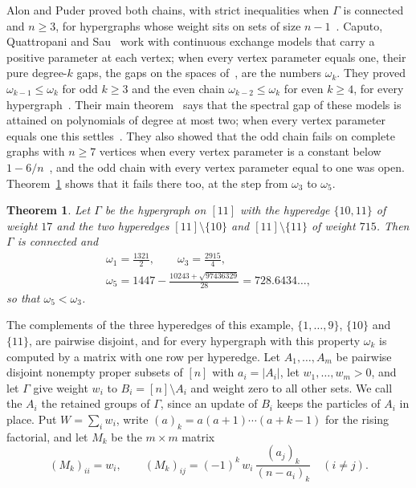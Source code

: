 \documentclass[11pt]{amsart}
\newtheorem{thm}{Theorem}[section]
\theoremstyle{remark}
\numberwithin{equation}{section}
\begin{document}
Alon and Puder proved both chains, with strict inequalities when $\Gamma$ is connected and $n\ge3$, for hypergraphs whose weight sits on sets of size $n-1$~\cite[Corollary~4.15]{AP26}. Caputo, Quattropani and Sau~\cite{CQS26} work with continuous exchange models that carry a positive parameter at each vertex; when every vertex parameter equals one, their pure degree-$k$ gaps, the gaps on the spaces of~\cite[(1.21)]{CQS26}, are the numbers $\omega_k$. They proved $\omega_{k-1}\le\omega_k$ for odd $k\ge3$ and the even chain $\omega_{k-2}\le\omega_k$ for even $k\ge4$, for every hypergraph~\cite[Remark~2.10, (2.50)--(2.51)]{CQS26}. Their main theorem~\cite[Theorem~1.1]{CQS26} says that the spectral gap of these models is attained on polynomials of degree at most two; when every vertex parameter equals one this settles~\cite[Conjecture~1.15]{AP26}. They also showed that the odd chain fails on complete graphs with $n\ge7$ vertices when every vertex parameter is a constant below $1-6/n$~\cite[Remark~2.10]{CQS26}, and the odd chain with every vertex parameter equal to one was open. Theorem~\ref{thm:example} shows that it fails there too, at the step from $\omega_3$ to $\omega_5$.

\begin{thm}\label{thm:example}
Let $\Gamma$ be the hypergraph on $[11]$ with the hyperedge $\{10,11\}$ of weight $17$ and the two hyperedges $[11]\setminus\{10\}$ and $[11]\setminus\{11\}$ of weight $715$. Then $\Gamma$ is connected and
\begin{gather*}
\omega_1=\frac{1321}2,\qquad \omega_3=\frac{2915}4,\\
\omega_5=1447-\frac{10243+\sqrt{97436329}}{28}=728.6434\ldots,
\end{gather*}
so that $\omega_5<\omega_3$.
\end{thm}

The complements of the three hyperedges of this example, $\{1,\dots,9\}$, $\{10\}$ and $\{11\}$, are pairwise disjoint, and for every hypergraph with this property $\omega_k$ is computed by a matrix with one row per hyperedge. Let $A_1,\dots,A_m$ be pairwise disjoint nonempty proper subsets of $[n]$ with $a_i=|A_i|$, let $w_1,\dots,w_m>0$, and let $\Gamma$ give weight $w_i$ to $B_i=[n]\setminus A_i$ and weight zero to all other sets. We call the $A_i$ the retained groups of $\Gamma$, since an update of $B_i$ keeps the particles of $A_i$ in place. Put $W=\sum_iw_i$, write $(a)_k=a(a+1)\cdots(a+k-1)$ for the rising factorial, and let $M_k$ be the $m\times m$ matrix
\begin{equation}\label{eq:M}
(M_k)_{ii}=w_i,\qquad (M_k)_{ij}=(-1)^k\,w_i\,\frac{(a_j)_k}{(n-a_i)_k}\quad(i\ne j).
\end{equation}
\end{document}

